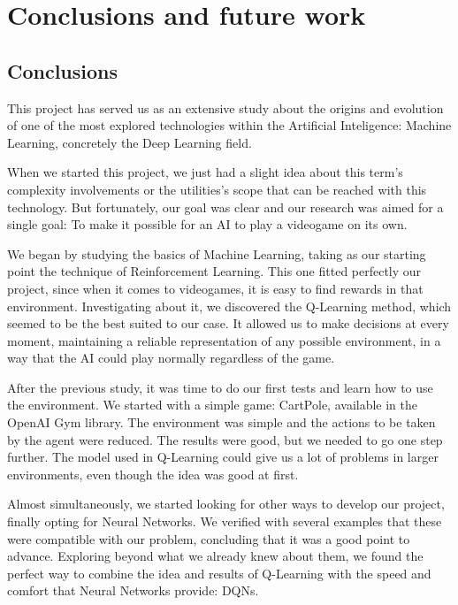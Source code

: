 \chapter{Conclusions and future work}
\label{cap:conclusions}


\section{Conclusions}

This project has served us as an extensive study about the origins and evolution of one of the most explored technologies within the Artificial Inteligence: Machine Learning, concretely the Deep Learning field.

When we started this project, we just had a slight idea about this term's complexity involvements or the utilities's scope that can be reached with this technology. But fortunately, our goal was clear and our research was aimed for a single goal: To make it possible for an AI to play a videogame on its own.

We began by studying the basics of Machine Learning, taking as our starting point the technique of Reinforcement Learning. This one fitted perfectly our project, since when it comes to videogames, it is easy to find rewards in that environment. Investigating about it, we discovered the Q-Learning method, which seemed to be the best suited to our case. It allowed us to make decisions at every moment, maintaining a reliable representation of any possible environment, in a way that the AI could play normally regardless of the game.

After the previous study, it was time to do our first tests and learn how to use the environment. We started with a simple game: CartPole, available in the OpenAI Gym library. The environment was simple and the actions to be taken by the agent were reduced. The results were good, but we needed to go one step further. The model used in Q-Learning could give us a lot of problems in larger environments, even though the idea was good at first.

Almost simultaneously, we started looking for other ways to develop our project, finally opting for Neural Networks. We verified with several examples that these were compatible with our problem, concluding that it was a good point to advance. Exploring beyond what we already knew about them, we found the perfect way to combine the idea and results of Q-Learning with the speed and comfort that Neural Networks provide: DQNs.

